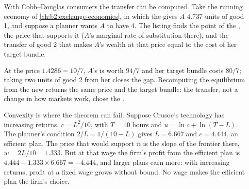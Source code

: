 With Cobb--Douglas consumers the transfer can be computed. Take the running economy of
\cref{ch:b2:exchange-economies}, in which the  gives $A$ 4.737 units of good 1, and
suppose a planner wants $A$ to have 4. The listing finds the point of the , the price that
supports it ($A$'s marginal rate of substitution there), and the transfer of good 2 that makes $A$'s wealth
at that price equal to the cost of her target bundle.

\label{lst:b2:welfare-theorems:second}

\label{out:b2:welfare-theorems:second}

At the price $1.4286 = 10/7$, $A$'s  is worth $94/7$ and her target bundle costs $80/7$; taking
two units of good 2 from her closes the gap. Recomputing the equilibrium from the new  returns
the same price and the target bundle: the transfer, not a change in how markets work, chose the
.

Convexity is where the theorem can fail. Suppose Crusoe's technology has increasing returns, $c =
L^2/10$, with $T = 10$ hours and $u = \ln c + \ln(T - L)$. The planner's condition $2/L = 1/(10 - L)$ gives
$L = 6.667$ and $c = 4.444$, an efficient plan. The price that would support it is the slope of the
frontier there, $w = 2L/10 = 1.333$. But at that wage the firm's profit from the efficient plan is $4.444 -
1.333 \times 6.667 = -4.444$, and larger plans earn more: with increasing returns, profit at a fixed wage
grows without bound. No wage makes the efficient plan the firm's choice.

